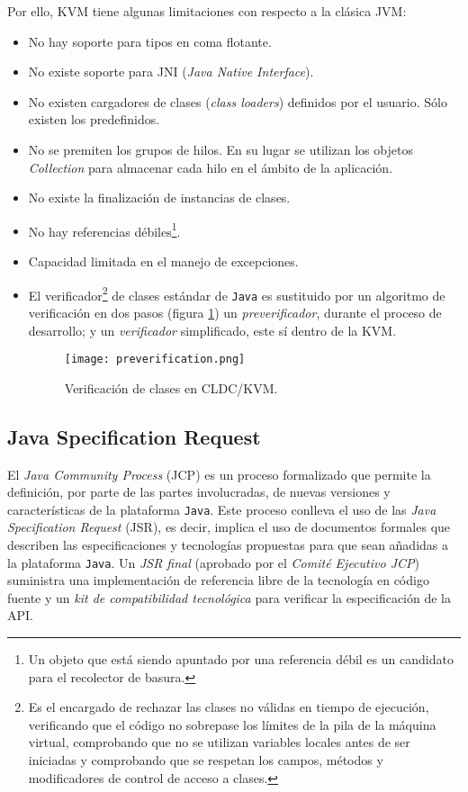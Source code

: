 Por ello, \acs{KVM} tiene algunas limitaciones con respecto a la clásica
\acs{JVM}:
\begin{itemize}
\item No hay soporte para tipos en coma flotante.
\item No existe soporte para \acs{JNI} (\emph{Java Native Interface}).
\item No existen cargadores de clases (\emph{class loaders}) definidos por
el usuario. Sólo existen los predefinidos.
\item No se premiten los grupos de hilos. En su lugar se utilizan los
objetos \emph{Collection} para almacenar cada hilo en el ámbito de la
aplicación.
\item No existe la finalización de instancias de clases.
\item No hay referencias débiles\footnote{Un objeto que está siendo apuntado
por una referencia débil es un candidato para el recolector de basura.}.
\item Capacidad limitada en el manejo de excepciones.
\item El verificador\footnote{Es el encargado de rechazar las clases no válidas 
en tiempo de ejecución, verificando que el código no sobrepase los límites de 
la pila de la máquina virtual, comprobando que no se utilizan variables locales 
antes de ser iniciadas y comprobando que se respetan los campos, métodos y 
modificadores de control de acceso a clases.} de clases estándar de
\texttt{Java} es sustituido por un algoritmo de verificación en dos pasos 
(figura \ref{fig:preverification}) un \emph{preverificador}, durante el proceso 
de desarrollo; y un \emph{verificador} simplificado, este sí dentro de la
\acs{KVM}.

  \begin{figure}[H]
    \begin{center}
      \texttt{[image: preverification.png]}
      \caption{Verificación de clases en \acs{CLDC}/\acs{KVM}.}
      \label{fig:preverification}
    \end{center}
  \end{figure}

\end{itemize}

\subsection{Java Specification Request}
El \emph{Java Community Process} (\acs{JCP}) es un proceso formalizado que
permite la definición, por parte de las partes involucradas, de nuevas
versiones y características de la plataforma \texttt{Java}. Este proceso
conlleva el uso de las \emph{Java Specification Request} (\acs{JSR}), es decir,
implica el uso de documentos formales que describen las especificaciones y
tecnologías propuestas para que sean añadidas a la plataforma \texttt{Java}.
Un \emph{\acs{JSR} final} (aprobado por el \emph{Comité Ejecutivo \acs{JCP}})
suministra una implementación de referencia libre de la tecnología en 
código fuente y un \emph{kit de compatibilidad tecnológica} para verificar
la especificación de la \acs{API}.

